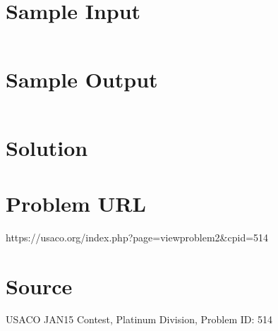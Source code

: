 \documentclass[12pt]{article}
\begin{document}
\section*{Sample Input}
\begin{verbatim}

\end{verbatim}

\section*{Sample Output}
\begin{verbatim}

\end{verbatim}

\section*{Solution}


\section*{Problem URL}
https://usaco.org/index.php?page=viewproblem2&cpid=514

\section*{Source}
USACO JAN15 Contest, Platinum Division, Problem ID: 514
\end{document}
